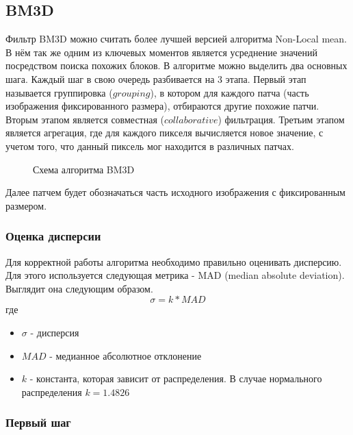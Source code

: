 \subsection{BM3D}
Фильтр BM3D можно считать более лучшей версией алгоритма Non-Local mean. В нём так же одним из ключевых моментов является
усреднение значений посредством поиска похожих блоков. В алгоритме можно выделить два основных шага. Каждый шаг в свою очередь разбивается на 3 этапа. Первый этап называется группировка ($grouping$), в котором для каждого патча (часть изображения фиксированного размера), отбираются другие похожие патчи. Вторым этапом является совместная ($collaborative$) фильтрация. Третьим этапом является агрегация, где для каждого пикселя вычисляется новое значение, с учетом того, что данный пиксель мог находится в различных патчах.
\begin{figure}[H]
	\caption{Схема алгоритма BM3D}
\end{figure}
Далее патчем будет обозначаться часть исходного изображения с фиксированным размером.
\subsubsection{Оценка дисперсии}
Для корректной работы алгоритма необходимо правильно оценивать дисперсию.
Для этого используется следующая метрика - MAD (median absolute deviation). Выглядит она следующим образом.
\begin{equation}
	\sigma = k * MAD
\end{equation}
где
\begin{itemize}
	\item $\sigma$ - дисперсия
	\item $MAD$ - медианное абсолютное отклонение
	\item $k$ - константа, которая зависит от распределения. В случае нормального распределения $k=1.4826$%
	
\end{itemize}
\subsubsection{Первый шаг}

